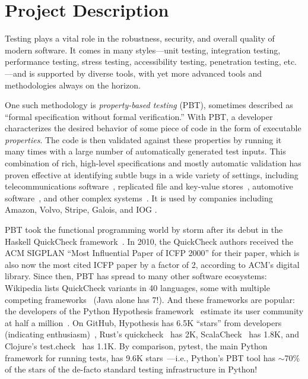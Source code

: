 \section*{Project Description}

Testing plays a vital role in the robustness, security, and overall
quality of modern software. It comes in many styles---unit testing,
integration testing, performance testing, stress testing,
accessibility testing, penetration testing, etc.---and is supported by
diverse tools, with yet more advanced tools and methodologies always on
the horizon.

One such methodology is {\em property-based testing} (PBT),
sometimes described as ``formal specification without formal
verification.''  With PBT, a developer characterizes the desired
behavior of
some piece of code in the form of executable {\em
  properties}. The code is
then validated against these properties by running it many times
with a large number of automatically generated test
inputs.
%
This combination of rich, high-level specifications and mostly
automatic validation has proven effective at identifying
subtle bugs in a wide variety of settings, including
telecommunications software~\cite{arts2006testing}, replicated
file and key-value
stores~\cite{MysteriesOfDropbox2016,Bornholt2021}, automotive
software~\cite{arts2015testing}, and other complex
systems~\cite{hughes_experiences_2016}.
It is used by companies including Amazon, Volvo, Stripe, Galois,
and IOG
.

PBT took the functional programming world by storm after its
debut in the Haskell QuickCheck framework~\cite{ClaessenHughes00}.  In
2010, the
QuickCheck authors received the ACM SIGPLAN ``Most Influential Paper of ICFP
2000'' for their paper, which is also now the most cited
ICFP paper by
a factor of 2, according to ACM's digital library.  Since then,
PBT has spread to many other software ecosystems:
%
Wikipedia lists QuickCheck variants in 40 languages, some
with multiple competing frameworks~\cite{QuickCheckWikipedia} (Java alone has
7!).
%
And these frameworks are popular:
the developers of the Python Hypothesis framework~\cite{maciver2019hypothesis,HypothesisGithub} estimate its user community
at half a million~\cite{ZacPersonalCommunication,noauthor_python_nodate}.  On GitHub,
Hypothesis has 6.5K ``stars'' from developers (indicating enthusiasm)~\cite{borges_whats_2018}, Rust's
quickcheck~\cite{RustQuickcheckGithub} has 2K,
ScalaCheck~\cite{ScalaCheckGithub} has 1.8K, and Clojure's
test.check~\cite{ClojureTest.checkGithub} has 1.1K.
By comparison, pytest, the main Python framework for running
tests, has 9.6K stars~\cite{PytestGitHub}---i.e., Python's PBT tool has
$\sim$70\% of the stars of the de-facto standard testing infrastructure in
Python!


